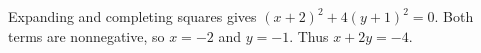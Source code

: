 Expanding and completing squares gives $(x+2)^2+4(y+1)^2=0$. Both terms are nonnegative, so $x=-2$ and $y=-1$. Thus $\boxed{x+2y=-4}$.
